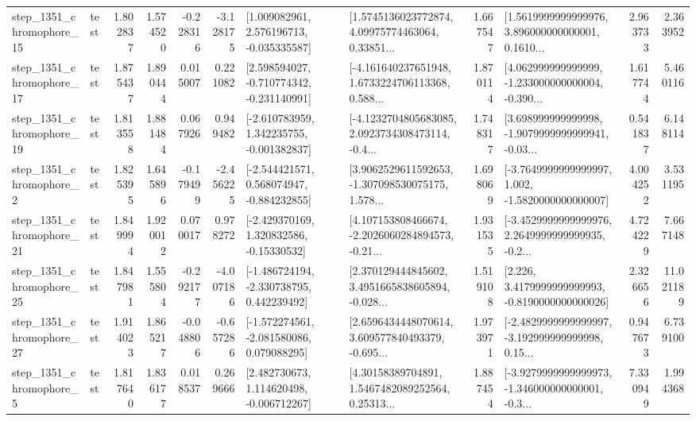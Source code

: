 \begin{tabular}{llrrrrllrlrr}
 step\_1351\_chromophore\_15 &      test &      1.802837 &    1.574520 &     -0.228316 & -3.128175 &    [1.009082961, 2.576196713, -0.035335587] &  [1.5745136023772874, 4.09975774463064, 0.33851... &       1.667547 &  [1.5619999999999976, 3.896000000000001, 0.1610... &            2.963733 &          2.363952 \\
 step\_1351\_chromophore\_17 &      test &      1.875437 &    1.890444 &      0.015007 &  0.221082 &   [2.598594027, -0.710774342, -0.231140991] &  [-4.161640237651948, 1.6733224706113368, 0.588... &       1.870114 &  [4.062999999999999, -1.233000000000004, -0.390... &            1.617744 &          5.460116 \\
 step\_1351\_chromophore\_19 &      test &      1.813558 &    1.881484 &      0.067926 &  0.949482 &   [-2.610783959, 1.342235755, -0.001382837] &  [-4.1232704805683085, 2.0923734308473114, -0.4... &       1.748317 &  [3.698999999999998, -1.9079999999999941, -0.03... &            0.541837 &          6.148114 \\
  step\_1351\_chromophore\_2 &      test &      1.825395 &    1.645896 &     -0.179499 & -2.456225 &   [-2.544421571, 0.568074947, -0.884232855] &  [3.9062529611592653, -1.307098530075175, 1.578... &       1.698069 &  [-3.7649999999999997, 1.002, -1.5820000000000007] &            4.004252 &          3.531195 \\
 step\_1351\_chromophore\_21 &      test &      1.849994 &    1.920012 &      0.070017 &  0.978272 &    [-2.429370169, 1.320832586, -0.15330532] &  [4.107153808466674, -2.2026060284894573, -0.21... &       1.931535 &  [-3.4529999999999976, 2.2649999999999935, -0.2... &            4.724229 &          7.667148 \\
 step\_1351\_chromophore\_25 &      test &      1.847981 &    1.555804 &     -0.292177 & -4.007186 &   [-1.486724194, -2.330738795, 0.442239492] &  [2.370129444845602, 3.4951665838605894, -0.028... &       1.519108 &   [2.226, 3.4179999999999993, -0.8190000000000026] &            2.326656 &         11.021189 \\
 step\_1351\_chromophore\_27 &      test &      1.914023 &    1.865217 &     -0.048806 & -0.657286 &   [-1.572274561, -2.081580086, 0.079088295] &  [2.6596434448070614, 3.609577840493379, -0.695... &       1.973971 &  [-2.4829999999999997, -3.192999999999998, 0.15... &            0.947673 &          6.739100 \\
  step\_1351\_chromophore\_5 &      test &      1.817640 &    1.836177 &      0.018537 &  0.269666 &    [2.482730673, 1.114620498, -0.006712267] &  [4.30158389704891, 1.5467482089252564, 0.25313... &       1.887454 &  [-3.9279999999999973, -1.346000000000001, -0.3... &            7.330949 &          1.994368 \\

\end{tabular}
